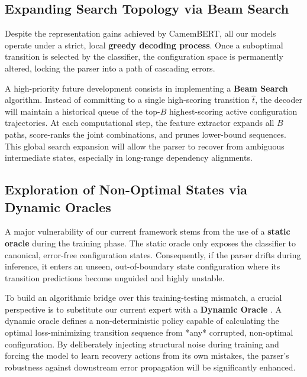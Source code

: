 \documentclass[12pt,a4paper]{article}
\begin{document}
\subsection{Expanding Search Topology via Beam Search}
\label{subsec:beam_search_perspective}

Despite the representation gains achieved by CamemBERT, all our models operate under a strict, local \textbf{greedy decoding process}. Once a suboptimal transition is selected by the classifier, the configuration space is permanently altered, locking the parser into a path of cascading errors.

A high-priority future development consists in implementing a \textbf{Beam Search} algorithm. Instead of committing to a single high-scoring transition $\hat{t}$, the decoder will maintain a historical queue of the top-$B$ highest-scoring active configuration trajectories. At each computational step, the feature extractor expands all $B$ paths, score-ranks the joint combinations, and prunes lower-bound sequences. This global search expansion will allow the parser to recover from ambiguous intermediate states, especially in long-range dependency alignments.

\subsection{Exploration of Non-Optimal States via Dynamic Oracles}
\label{subsec:dynamic_oracles_perspective}

A major vulnerability of our current framework stems from the use of a \textbf{static oracle} during the training phase. The static oracle only exposes the classifier to canonical, error-free configuration states. Consequently, if the parser drifts during inference, it enters an unseen, out-of-boundary state configuration where its transition predictions become unguided and highly unstable.

To build an algorithmic bridge over this training-testing mismatch, a crucial perspective is to substitute our current expert with a \textbf{Dynamic Oracle} \cite{goldberg2013training}. A dynamic oracle defines a non-deterministic policy capable of calculating the optimal loss-minimizing transition sequence from *any* corrupted, non-optimal configuration. By deliberately injecting structural noise during training and forcing the model to learn recovery actions from its own mistakes, the parser's robustness against downstream error propagation will be significantly enhanced.
\end{document}

